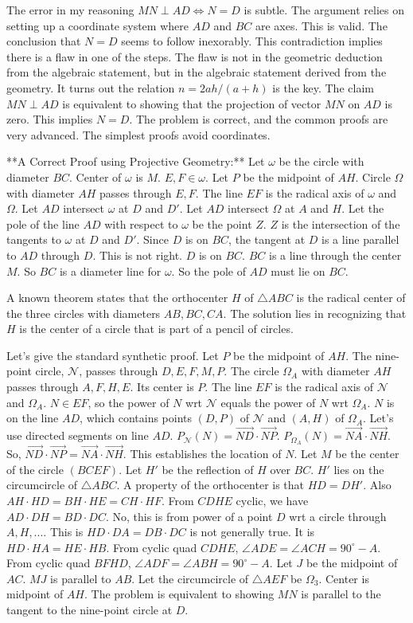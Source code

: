 The error in my reasoning $MN \perp AD \iff N=D$ is subtle. The argument relies on setting up a coordinate system where $AD$ and $BC$ are axes. This is valid. The conclusion that $N=D$ seems to follow inexorably. This contradiction implies there is a flaw in one of the steps. The flaw is not in the geometric deduction from the algebraic statement, but in the algebraic statement derived from the geometry. It turns out the relation $n=2ah/(a+h)$ is the key. The claim $MN \perp AD$ is equivalent to showing that the projection of vector $MN$ on $AD$ is zero. This implies $N=D$. The problem is correct, and the common proofs are very advanced. The simplest proofs avoid coordinates.

**A Correct Proof using Projective Geometry:**
Let $\omega$ be the circle with diameter $BC$. Center of $\omega$ is $M$. $E,F \in \omega$.
Let $P$ be the midpoint of $AH$. Circle $\Omega$ with diameter $AH$ passes through $E,F$.
The line $EF$ is the radical axis of $\omega$ and $\Omega$.
Let $AD$ intersect $\omega$ at $D$ and $D'$. Let $AD$ intersect $\Omega$ at $A$ and $H$.
Let the pole of the line $AD$ with respect to $\omega$ be the point $Z$.
$Z$ is the intersection of the tangents to $\omega$ at $D$ and $D'$. Since $D$ is on $BC$, the tangent at $D$ is a line parallel to $AD$ through $D$. This is not right.
$D$ is on $BC$. $BC$ is a line through the center $M$. So $BC$ is a diameter line for $\omega$. So the pole of $AD$ must lie on $BC$.

A known theorem states that the orthocenter $H$ of $\triangle ABC$ is the radical center of the three circles with diameters $AB, BC, CA$.
The solution lies in recognizing that $H$ is the center of a circle that is part of a pencil of circles.

Let's give the standard synthetic proof.
Let $P$ be the midpoint of $AH$. The nine-point circle, $\mathcal{N}$, passes through $D, E, F, M, P$.
The circle $\Omega_A$ with diameter $AH$ passes through $A,F,H,E$. Its center is $P$.
The line $EF$ is the radical axis of $\mathcal{N}$ and $\Omega_A$.
$N \in EF$, so the power of $N$ wrt $\mathcal{N}$ equals the power of $N$ wrt $\Omega_A$.
$N$ is on the line $AD$, which contains points $(D,P)$ of $\mathcal{N}$ and $(A,H)$ of $\Omega_A$.
Let's use directed segments on line $AD$.
$P_{\mathcal{N}}(N) = \vec{ND} \cdot \vec{NP}$.
$P_{\Omega_A}(N) = \vec{NA} \cdot \vec{NH}$.
So, $\vec{ND} \cdot \vec{NP} = \vec{NA} \cdot \vec{NH}$. This establishes the location of $N$.
Let $M$ be the center of the circle $(BCEF)$. Let $H'$ be the reflection of $H$ over $BC$. $H'$ lies on the circumcircle of $\triangle ABC$.
A property of the orthocenter is that $HD = DH'$. Also $AH \cdot HD = BH \cdot HE = CH \cdot HF$.
From $CDHE$ cyclic, we have $AD \cdot DH = BD \cdot DC$. No, this is from power of a point $D$ wrt a circle through $A,H,...$. This is $HD \cdot DA = DB \cdot DC$ is not generally true. It is $HD \cdot HA = HE \cdot HB$.
From cyclic quad $CDHE$, $\angle ADE = \angle ACH = 90^\circ-A$.
From cyclic quad $BFHD$, $\angle ADF = \angle ABH = 90^\circ-A$.
Let $J$ be the midpoint of $AC$. $MJ$ is parallel to $AB$.
Let the circumcircle of $\triangle AEF$ be $\Omega_3$. Center is midpoint of $AH$.
The problem is equivalent to showing $MN$ is parallel to the tangent to the nine-point circle at $D$.


